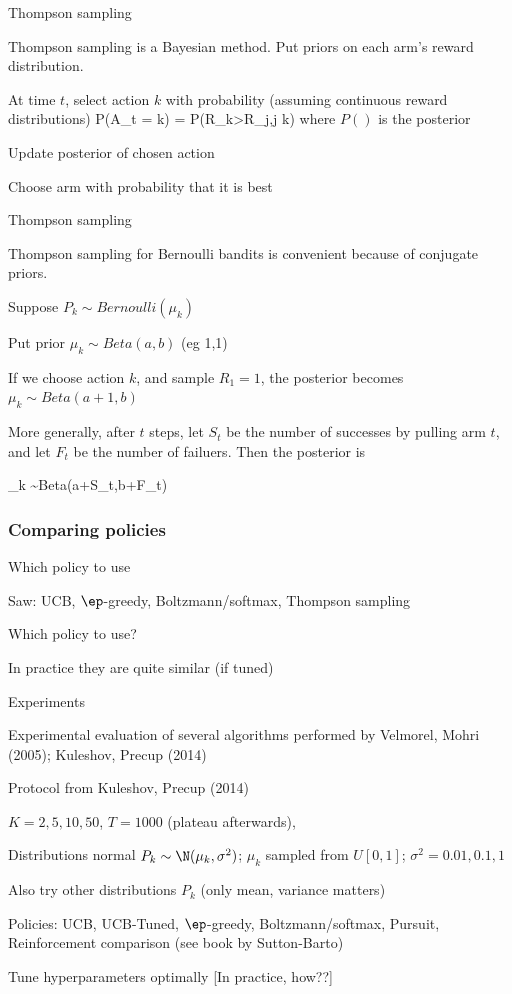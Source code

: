 \documentclass[english]{article}
\begin{document}
\item {Thompson sampling}
\bitem 
\item Thompson sampling is a Bayesian method. Put priors on each arm's reward distribution. 
\benum 
\item At time $t$, select action $k$ with probability (assuming continuous reward distributions)
\beqs P(A_t = k) = P(R_k>R_j,\forall j \neq k)\eeqs
where $P()$ is the posterior
\item Update posterior of chosen action
\eenum
\item Choose arm with probability that it is best
\eitem



\item {Thompson sampling}
\bitem 
\item Thompson sampling for Bernoulli bandits is convenient because of conjugate priors. 
\item Suppose $P_k \sim Bernoulli(\mu_k)$
\item Put prior $\mu_k \sim Beta(a,b)$ (eg 1,1)
\item If we choose action $k$, and sample $R_1=1$, the posterior becomes  $\mu_k \sim Beta(a+1,b)$
\item More generally, after $t$ steps, let $S_t$ be the number of successes by pulling arm $t$, and let $F_t$ be the number of failuers. Then the posterior is

\beqs\mu_k \sim Beta(a+S_t,b+F_t)\eeqs
\eitem

\eenum

\subsubsection{Comparing policies}

\benum

\item {Which policy to use}
\bitem
\item Saw: UCB, $\ep$-greedy, Boltzmann/softmax, Thompson sampling
\item Which policy to use?
\item In practice they are quite similar (if tuned)
\eitem



\item {Experiments}
\bitem
\item Experimental evaluation of several algorithms performed by Velmorel, Mohri (2005); Kuleshov, Precup (2014)
\item Protocol from Kuleshov, Precup (2014)
\bitem
\item $K=2,5,10,50$, $T=1000$ (plateau afterwards),
\item Distributions normal $P_k \sim \N(\mu_k,\sigma^2)$; $\mu_k$ sampled from $U[0,1]$; $\sigma^2 = 0.01,0.1,1$
\item Also try other distributions $P_k$ (only mean, variance matters)
\item Policies: UCB, UCB-Tuned, $\ep$-greedy, Boltzmann/softmax, Pursuit, Reinforcement comparison (see book by Sutton-Barto)
\item Tune hyperparameters optimally [In practice, how??]
\eitem
\eitem
\end{document}
